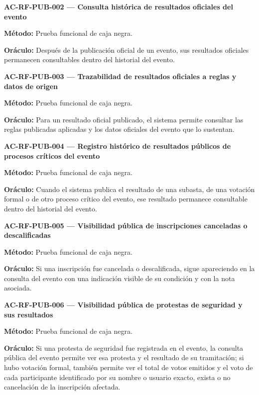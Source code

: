 \documentclass[10pt,letterpaper]{article}
\begin{document}
\noindent\textbf{AC-RF-PUB-002 --- Consulta histórica de resultados oficiales del evento}\par
\textbf{Método:} Prueba funcional de caja negra.\par
\textbf{Oráculo:} Después de la publicación oficial de un evento, sus resultados oficiales permanecen consultables dentro del historial del evento.\par\vspace{0.45em}
\noindent\textbf{AC-RF-PUB-003 --- Trazabilidad de resultados oficiales a reglas y datos de origen}\par
\textbf{Método:} Prueba funcional de caja negra.\par
\textbf{Oráculo:} Para un resultado oficial publicado, el sistema permite consultar las reglas publicadas aplicadas y los datos oficiales del evento que lo sustentan.\par\vspace{0.45em}
\noindent\textbf{AC-RF-PUB-004 --- Registro histórico de resultados públicos de procesos críticos del evento}\par
\textbf{Método:} Prueba funcional de caja negra.\par
\textbf{Oráculo:} Cuando el sistema publica el resultado de una subasta, de una votación formal o de otro proceso crítico del evento, ese resultado permanece consultable dentro del historial del evento.\par\vspace{0.45em}
\noindent\textbf{AC-RF-PUB-005 --- Visibilidad pública de inscripciones canceladas o descalificadas}\par
\textbf{Método:} Prueba funcional de caja negra.\par
\textbf{Oráculo:} Si una inscripción fue cancelada o descalificada, sigue apareciendo en la consulta del evento con una indicación visible de su condición y con la nota asociada.\par\vspace{0.45em}
\noindent\textbf{AC-RF-PUB-006 --- Visibilidad pública de protestas de seguridad y sus resultados}\par
\textbf{Método:} Prueba funcional de caja negra.\par
\textbf{Oráculo:} Si una protesta de seguridad fue registrada en el evento, la consulta pública del evento permite ver esa protesta y el resultado de su tramitación; si hubo votación formal, también permite ver el total de votos emitidos y el voto de cada participante identificado por su nombre o usuario exacto, exista o no cancelación de la inscripción afectada.\par\vspace{0.45em}
\end{document}
